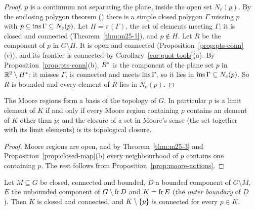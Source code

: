 \begin{proof}
$p$ is a continuum not separating the plane, inside the open set $N_e(p)$. By the enclosing polygon
theorem () there is a simple closed polygon $\Gamma$ missing $p$ with
$p\subseteq\operatorname{ins}\Gamma\subseteq N_e(p)$. Let $H=\pi(\Gamma)$, the set of elements meeting $\Gamma$; it is
closed and connected (Theorem~\ref{thm:m25-1}), and $p\notin H$. Let $R$ be the component of $p$ in
$G\setminus H$. It is open and connected (Proposition~\ref{prop:pts-conn}(c)), and its frontier is
connected by Corollary~\ref{cor:quot-tools}(a). By Proposition~\ref{prop:pts-conn}(b), $R^{\ast}$ is the
component of the plane set $p$ in $\mathbb{R}^2\setminus H^{\ast}$; it misses $\Gamma$, is connected and meets
$\operatorname{ins}\Gamma$, so it lies in $\operatorname{ins}\Gamma\subseteq N_e(p)$. So $R$ is bounded and every element of $R$ lies in
$N_e(p)$.
\end{proof}


\begin{theorem}\label{thm:m25-4}
The Moore regions form a basis of the topology of $G$. In particular $p$ is a limit element of $K$
if and only if every Moore region containing $p$ contains an element of $K$ other than $p$; and the
closure of a set in Moore's sense (the set together with its limit elements) is its topological
closure.
\end{theorem}

\begin{proof}
Moore regions are open, and by Theorem~\ref{thm:m25-3} and Proposition~\ref{prop:closed-map}(b) every
neighbourhood of $p$ contains one containing $p$. The rest follows from
Proposition~\ref{prop:moore-notions}.
\end{proof}


\begin{theorem}\label{thm:m25-2}
Let $M\subseteq G$ be closed, connected and bounded, $D$ a bounded component of $G\setminus M$, $E$
the unbounded component of $G\setminus\operatorname{fr} D$ and $K=\operatorname{fr} E$ (the \emph{outer boundary} of $D$). Then
$K$ is closed and connected, and $K\setminus\left\{ p \right\}$ is connected for every $p\in K$.
\end{theorem}

